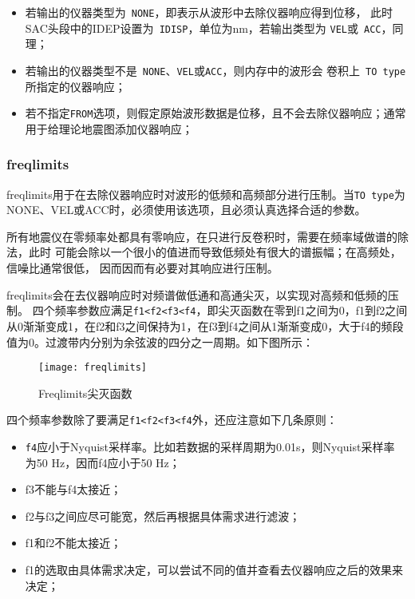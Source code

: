 \begin{itemize}
\item 若输出的仪器类型为~\verb+NONE+，即表示从波形中去除仪器响应得到位移，
    此时SAC头段中的IDEP设置为~\verb+IDISP+，单位为nm，若输出类型为
    \verb+VEL+或~\verb+ACC+，同理；
\item 若输出的仪器类型不是~\verb+NONE+、\verb+VEL+或\verb+ACC+，则内存中的波形会
    卷积上~\verb+TO type+所指定的仪器响应；
\item 若不指定\verb+FROM+选项，则假定原始波形数据是位移，且不会去除仪器响应；通常
    用于给理论地震图添加仪器响应；
\end{itemize}

\subsubsection{freqlimits}
freqlimits用于在去除仪器响应时对波形的低频和高频部分进行压制。当\verb+TO type+为
NONE、VEL或ACC时，必须使用该选项，且必须认真选择合适的参数。

所有地震仪在零频率处都具有零响应，在只进行反卷积时，需要在频率域做谱的除法，此时
可能会除以一个很小的值进而导致低频处有很大的谱振幅；在高频处，信噪比通常很低，
因而因而有必要对其响应进行压制。

freqlimits会在去仪器响应时对频谱做低通和高通尖灭，以实现对高频和低频的压制。
四个频率参数应满足\verb+f1<f2<f3<f4+，即尖灭函数在零到f1之间为0，f1到f2之间
从0渐渐变成1，在f2和f3之间保持为1，在f3到f4之间从1渐渐变成0，大于f4的频段
值为0。过渡带内分别为余弦波的四分之一周期。如下图所示：

\begin{figure}[H]
\centering
\texttt{[image: freqlimits]}
\caption{Freqlimits尖灭函数}
\label{fig:freqlimits}
\end{figure}

四个频率参数除了要满足\verb+f1<f2<f3<f4+外，还应注意如下几条原则：
\begin{itemize}
\item \verb+f4+应小于Nyquist采样率。比如若数据的采样周期为0.01s，则Nyquist采样率
    为50 Hz，因而f4应小于50 Hz；
\item f3不能与f4太接近；
\item f2与f3之间应尽可能宽，然后再根据具体需求进行滤波；
\item f1和f2不能太接近；
\item f1的选取由具体需求决定，可以尝试不同的值并查看去仪器响应之后的效果来决定；
\end{itemize}

